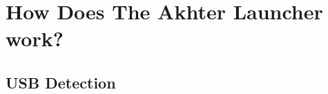 {\color{teal!90}\chapter{How Does The Akhter Launcher work?}\label{cap:how-does-the-akhter-launcher-work}}


\minitoc%

\section{USB Detection}\label{sec:usb-detection}